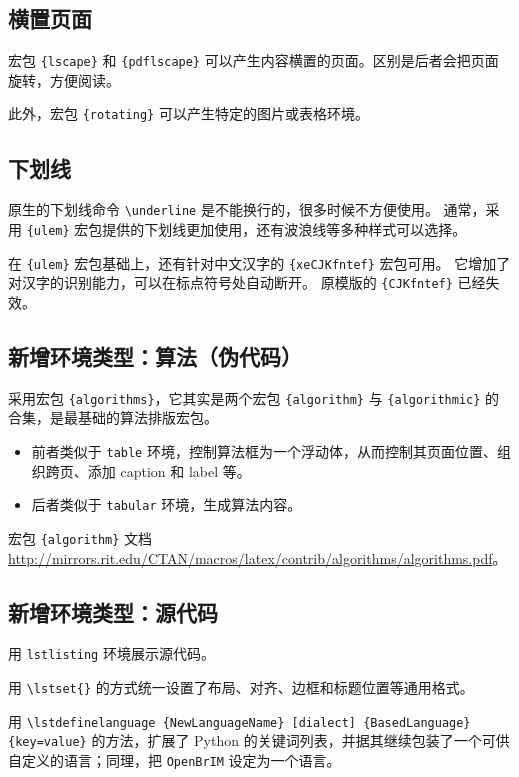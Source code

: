 \documentclass[../Main/thesis.tex]{subfiles}
\begin{document}
\subsection{横置页面}

宏包 \texttt{\{lscape\}} 和 \texttt{\{pdflscape\}}
可以产生内容横置的页面。区别是后者会把页面旋转，方便阅读。

此外，宏包 \texttt{\{rotating\}} 可以产生特定的图片或表格环境。

\subsection{下划线}

原生的下划线命令 \texttt{\textbackslash{}underline}
是不能换行的，很多时候不方便使用。 通常，采用 \texttt{\{ulem\}}
宏包提供的下划线更加使用，还有波浪线等多种样式可以选择。

在 \texttt{\{ulem\}} 宏包基础上，还有针对中文汉字的
\texttt{\{xeCJKfntef\}} 宏包可用。
它增加了对汉字的识别能力，可以在标点符号处自动断开。 原模版的
\texttt{\{CJKfntef\}} 已经失效。

\subsection{新增环境类型：算法（伪代码）}

采用宏包 \texttt{\{algorithms\}}，它其实是两个宏包
\texttt{\{algorithm\}} 与 \texttt{\{algorithmic\}}
的合集，是最基础的算法排版宏包。

\begin{itemize}
\item
  前者类似于 \texttt{table}
  环境，控制算法框为一个浮动体，从而控制其页面位置、组织跨页、添加
  caption 和 label 等。
\item
  后者类似于 \texttt{tabular} 环境，生成算法内容。
\end{itemize}

宏包 \texttt{\{algorithm\}} 文档
\url{http://mirrors.rit.edu/CTAN/macros/latex/contrib/algorithms/algorithms.pdf}。

\subsection{新增环境类型：源代码}

用 \texttt{lstlisting} 环境展示源代码。

用 \texttt{\textbackslash{}lstset\{\}}
的方式统一设置了布局、对齐、边框和标题位置等通用格式。

用
\texttt{\textbackslash{}lstdefinelanguage \{NewLanguageName\} [dialect] \{BasedLanguage\} \{key=value\}}
的方法，扩展了 Python
的关键词列表，并据其继续包装了一个可供自定义的语言；同理，把
\texttt{OpenBrIM} 设定为一个语言。
\end{document}
